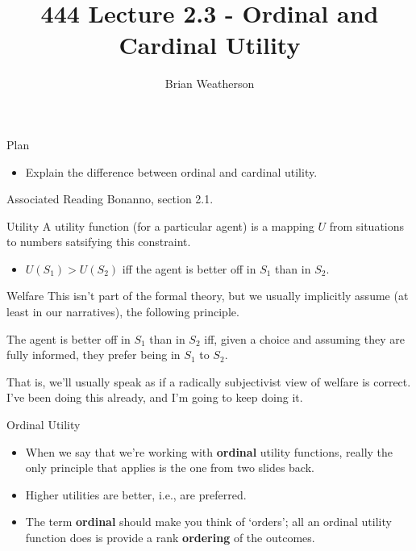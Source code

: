 \documentclass[
  ignorenonframetext,
]{beamer}
\title{444 Lecture 2.3 - Ordinal and Cardinal Utility}
\author{Brian Weatherson}
\date{}
\providecommand{\tightlist}{%
  \setlength{\itemsep}{0pt}\setlength{\parskip}{0pt}}
\renewenvironment*{quote}	
	{\list{}{\rightmargin   \leftmargin} \item } 	
	{\endlist }
\begin{document}
\frame{\titlepage}

\begin{frame}{Plan}
\protect\hypertarget{plan}{}
\begin{itemize}
\tightlist
\item
  Explain the difference between ordinal and cardinal utility.
\end{itemize}
\end{frame}

\begin{frame}{Associated Reading}
\protect\hypertarget{associated-reading}{}
Bonanno, section 2.1.
\end{frame}

\begin{frame}{Utility}
\protect\hypertarget{utility}{}
A utility function (for a particular agent) is a mapping \(U\) from
situations to numbers satsifying this constraint.

\begin{itemize}
\tightlist
\item
  \(U(S_1) > U(S_2)\) iff the agent is better off in \(S_1\) than in
  \(S_2\).
\end{itemize}
\end{frame}

\begin{frame}{Welfare}
\protect\hypertarget{welfare}{}
This isn't part of the formal theory, but we usually implicitly assume
(at least in our narratives), the following principle.

\begin{quote}
The agent is better off in \(S_1\) than in \(S_2\) iff, given a choice
and assuming they are fully informed, they prefer being in \(S_1\) to
\(S_2\).
\end{quote}

That is, we'll usually speak as if a radically subjectivist view of
welfare is correct. I've been doing this already, and I'm going to keep
doing it.
\end{frame}

\begin{frame}{Ordinal Utility}
\protect\hypertarget{ordinal-utility}{}
\begin{itemize}
\tightlist
\item
  When we say that we're working with \textbf{ordinal} utility
  functions, really the only principle that applies is the one from two
  slides back.
\item
  Higher utilities are better, i.e., are preferred.
\item
  The term \textbf{ordinal} should make you think of `orders'; all an
  ordinal utility function does is provide a rank \textbf{ordering} of
  the outcomes.
\end{itemize}
\end{frame}
\end{document}
